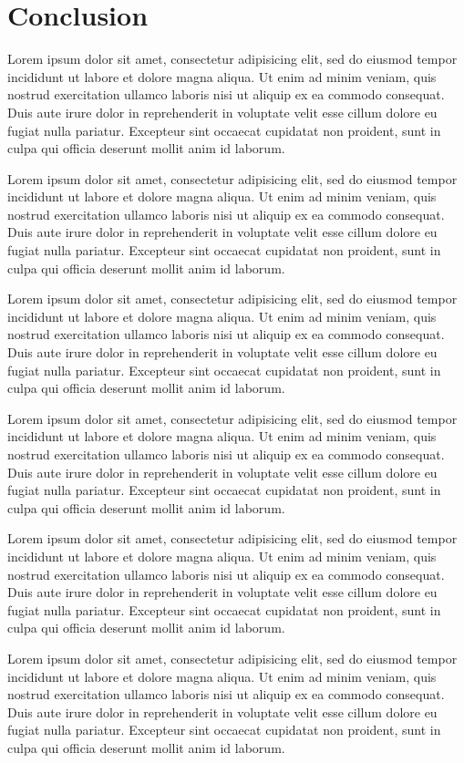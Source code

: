 \documentclass[11pt,letterpaper]{article}
\begin{document}
\section{Conclusion}

Lorem ipsum dolor sit amet, consectetur adipisicing elit, sed do eiusmod tempor incididunt ut labore et dolore magna aliqua. Ut enim ad minim veniam, quis nostrud exercitation ullamco laboris nisi ut aliquip ex ea commodo consequat. Duis aute irure dolor in reprehenderit in voluptate velit esse cillum dolore eu fugiat nulla pariatur. Excepteur sint occaecat cupidatat non proident, sunt in culpa qui officia deserunt mollit anim id laborum.

Lorem ipsum dolor sit amet, consectetur adipisicing elit, sed do eiusmod tempor incididunt ut labore et dolore magna aliqua. Ut enim ad minim veniam, quis nostrud exercitation ullamco laboris nisi ut aliquip ex ea commodo consequat. Duis aute irure dolor in reprehenderit in voluptate velit esse cillum dolore eu fugiat nulla pariatur. Excepteur sint occaecat cupidatat non proident, sunt in culpa qui officia deserunt mollit anim id laborum.

Lorem ipsum dolor sit amet, consectetur adipisicing elit, sed do eiusmod tempor incididunt ut labore et dolore magna aliqua. Ut enim ad minim veniam, quis nostrud exercitation ullamco laboris nisi ut aliquip ex ea commodo consequat. Duis aute irure dolor in reprehenderit in voluptate velit esse cillum dolore eu fugiat nulla pariatur. Excepteur sint occaecat cupidatat non proident, sunt in culpa qui officia deserunt mollit anim id laborum.


Lorem ipsum dolor sit amet, consectetur adipisicing elit, sed do eiusmod tempor incididunt ut labore et dolore magna aliqua. Ut enim ad minim veniam, quis nostrud exercitation ullamco laboris nisi ut aliquip ex ea commodo consequat. Duis aute irure dolor in reprehenderit in voluptate velit esse cillum dolore eu fugiat nulla pariatur. Excepteur sint occaecat cupidatat non proident, sunt in culpa qui officia deserunt mollit anim id laborum.

Lorem ipsum dolor sit amet, consectetur adipisicing elit, sed do eiusmod tempor incididunt ut labore et dolore magna aliqua. Ut enim ad minim veniam, quis nostrud exercitation ullamco laboris nisi ut aliquip ex ea commodo consequat. Duis aute irure dolor in reprehenderit in voluptate velit esse cillum dolore eu fugiat nulla pariatur. Excepteur sint occaecat cupidatat non proident, sunt in culpa qui officia deserunt mollit anim id laborum.

Lorem ipsum dolor sit amet, consectetur adipisicing elit, sed do eiusmod tempor incididunt ut labore et dolore magna aliqua. Ut enim ad minim veniam, quis nostrud exercitation ullamco laboris nisi ut aliquip ex ea commodo consequat. Duis aute irure dolor in reprehenderit in voluptate velit esse cillum dolore eu fugiat nulla pariatur. Excepteur sint occaecat cupidatat non proident, sunt in culpa qui officia deserunt mollit anim id laborum.



\end{document}
